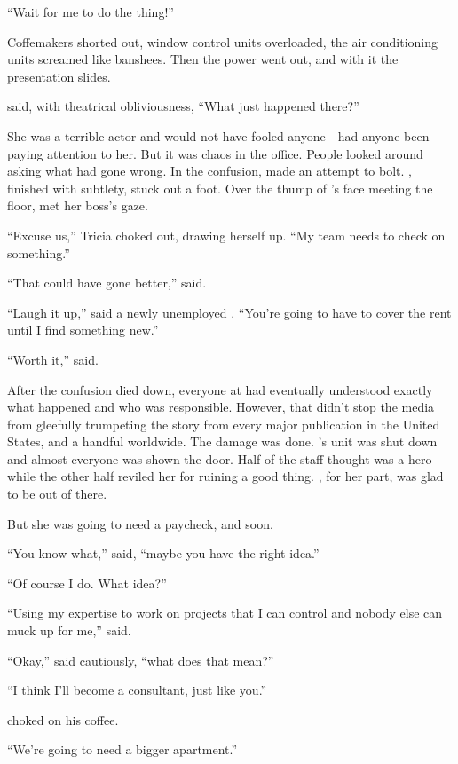 ``Wait for me to do the thing!''

Coffemakers shorted out, window control units overloaded, the air conditioning units screamed like banshees. Then the power went out, and with it the presentation slides.

{\protag} said, with theatrical obliviousness, ``What just happened there?''

She was a terrible actor and would not have fooled anyone---had anyone been paying attention to her. But it was chaos in the office. People looked around asking what had gone wrong. In the confusion, {\energyJerk} made an attempt to bolt. {\protag}, finished with subtlety, stuck out a foot. Over the thump of {\energyJerk}'s face meeting the floor, {\protag} met her boss's gaze.

``Excuse us,'' Tricia choked out, drawing herself up. ``My team needs to check on something.''

\bigbreak

``That could have gone better,'' {\sidetag} said.

``Laugh it up,'' said a newly unemployed {\protag}. ``You're going to have to cover the rent until I find something new.''

``Worth it,'' {\sidetag} said.

After the confusion died down, everyone at {\energyCompany} had eventually understood exactly what happened and who was responsible. However, that didn't stop the media from gleefully trumpeting the story from every major publication in the United States, and a handful worldwide. The damage was done. {\protag}'s unit was shut down and almost everyone was shown the door. Half of the staff thought {\protag} was a hero while the other half reviled her for ruining a good thing. {\protag}, for her part, was glad to be out of there.

But she was going to need a paycheck, and soon.

``You know what,'' {\protag} said, ``maybe you have the right idea.''

``Of course I do. What idea?''

``Using my expertise to work on projects that I can control and nobody else can muck up for me,'' {\protag} said.

``Okay,'' {\sidetag} said cautiously, ``what does that mean?''

``I think I'll become a consultant, just like you.''

{\sidetag} choked on his coffee.

``We're going to need a bigger apartment.''